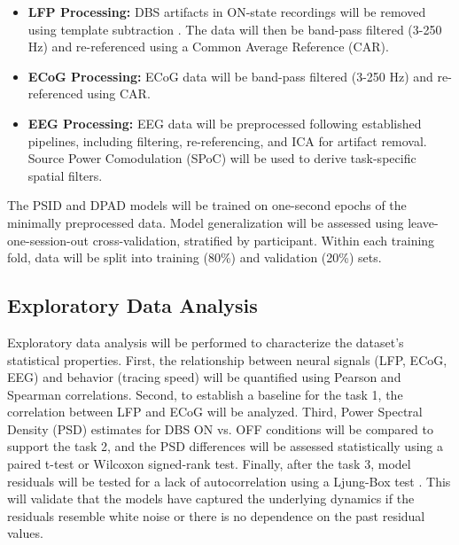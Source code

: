 \documentclass[12pt, a4paper]{article}
\begin{document}
\begin{itemize}

    \item \textbf{LFP Processing:} DBS artifacts in ON-state recordings will be removed using template subtraction \parencite{qianMethodRemovalDeep2017,hammerArtifactCharacterizationMultipurpose2022}. The data will then be band-pass filtered (3-250 Hz) and re-referenced using a Common Average Reference (CAR).

    \item \textbf{ECoG Processing:} ECoG data will be band-pass filtered (3-250 Hz) and re-referenced using CAR.

    \item \textbf{EEG Processing:} EEG data will be preprocessed following established pipelines, including filtering, re-referencing, and ICA for artifact removal. Source Power Comodulation (SPoC) will be used to derive task-specific spatial filters.

\end{itemize}

The PSID and DPAD models will be trained on one-second epochs of the minimally preprocessed data. Model generalization will be assessed using leave-one-session-out cross-validation, stratified by participant. Within each training fold, data will be split into training (80\%) and validation (20\%) sets.

\subsection{Exploratory Data Analysis}

Exploratory data analysis will be performed to characterize the dataset's statistical properties. First, the relationship between neural signals (LFP, ECoG, EEG) and behavior (tracing speed) will be quantified using Pearson and Spearman correlations. Second, to establish a baseline for the task 1, the correlation between LFP and ECoG will be analyzed. Third, Power Spectral Density (PSD) estimates for DBS ON vs. OFF conditions will be compared to support the task 2, and the PSD differences will be assessed statistically using a paired t-test or Wilcoxon signed-rank test. Finally, after the task 3, model residuals will be tested for a lack of autocorrelation using a Ljung-Box test \parencite{ljungMeasureLackFit1978}. This will validate that the models have captured the underlying dynamics if the residuals resemble white noise or there is no dependence on the past residual values.
\end{document}
